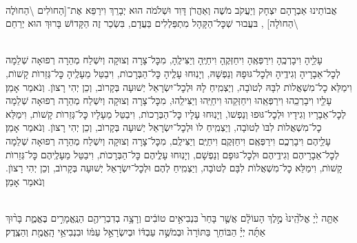 \documentclass[twoside, openany, parskip=half, 11pt]{book}
\begin{document}
\begin{sometimes}
\\
אֲבוֹתֵינוּ אַבְרָהָם יִצְחָק וְיַעֲקֹב מֹשֶׁה וְאַהֲרֹן דָּוִד וּשְׁלֹמֹה הוּא יְבָרֵךְ וִירַפֵּא אֶת־[הַחוׂלִים \textbackslash הַחוׂלֶה \textbackslash הַחוׂלָה]
,
בּעֲבוּר שְׁכׇּל־הַקָּהָל מִתְפַּלְלִים בַּעֲדָם, בִּשְׂכַר זֶה
הַקָּדוֹשׁ בָּרוּךְ הוּא יְרַחֵם
\setcolumnwidth{1.4in,1.4in,1.4in}
\begin{paracol}{3}
\\
עָלֵָיהָ וִיבָרְכֶֽהָ וִירַפְּאֶֽהָ וִיחַזְּקֶֽהָ וִיחַיֶּֽהָ וְיַצִּילֶֽהָ, מִכׇּל־צָרָה וְצוּקָה וְיִשְׁלַח מְהֵרָה רְפוּאָה שְׁלֵמָה לְכׇל־אֵבָרָיהָ וְגִידֶֽיהָ וּלְכׇל־גּוּפָהּ וְנַפְשָׁהּ, וְיָנֽוּחוּ עָלְֶיהָ כׇּל־הַבְּרָכוׂת, וִיבַטֵּל מֵעָלֶֽיהָ כׇּל־גְּזֵרוׂת קָשׁוׂת, וִימַלֵּא כׇל־מִשְׁאֲלוׂת לִבָּהּ לְטוׂבָה, וְיַצְמִֽיחַ לָהּ וּלְכׇל־יִשְׂרָאֵל יְשׁוּעָה בְּקָרוׂב, וְכֵן יְהִי רָצוׂן. וְנֹאמַר אָמֵן׃
\switchcolumn
{}\\
עָלֵָיו וִיבָרְכֵֽהוּ וִירַפְּאֵֽהוּ וִיחַזְּקֵהוּ וִיחַיֵּֽהוּ וְיַצִּילֵֽהוּ, מִכׇּל־צָרָה וְצוּקָה וְיִשְׁלַח מְהֵרָה רְפוּאָה שְׁלֵמָה לְכׇל־אֵבָרָיו וְגִידָיו וּלְכׇל־גּוּפוּ וְנַפְשׁוׂ, וְיָנֽוּחוּ עָלָיו כׇּל־הַבְּרָכוׂת, וִיבַטֵּל מֵעָלָיו כׇּל־גְּזֵרוׂת קָשׁוׂת, וִימַלֵּא כׇל־מִשְׁאֲלוׂת לִבּוׂ לְטוׂבָה, וְיַצְמִֽיחַ לוׂ וּלְכׇל־יִשְׂרָאֵל יְשׁוּעָה בְּקָרוׂב, וְכֵן יְהִי רָצוׂן. וְנֹאמַר אָמֵן׃
\switchcolumn
{}\\
עָלֵָיהֶם וִיבָרְכְֶם וִירַפְּאֶֽם וִיחַזְּקֶֽם וִיחַיֶּֽם וְיַצִּילֶֽם, מִכׇּל־צָרָה וְצוּקָה וְיִשְׁלַח מְהֵרָה רְפוּאָה שְׁלֵמָה לְכׇל־אֵבָרָיהֶם וְגִידֶֽיהֶם וּלְכׇל־גּוּפָם וְנַפְשָׁם, וְיָנֽוּחוּ עָלְֶיהֶם כׇּל־הַבְּרָכוׂת, וִיבַטֵּל מֵעָלֶֽיהֶם כׇּל־גְּזֵרוׂת קָשׁוׂת, וִימַלֵּא כׇל־מִשְׁאֲלוׂת לִבָּם לְטוׂבָה, וְיַצְמִֽיחַ לְהֶם וּלְכׇל־יִשְׂרָאֵל יְשׁוּעָה בְּקָרוׂב, וְכֵן יְהִי רָצוׂן. וְנֹאמַר אָמֵן׃
\end{paracol}

\end{sometimes}

\halfkaddish

\hagbaha
\newpage
{}

\\
אַתָּ֤ה יְ֙יָ אֱלֹ֙הֵֽינוּ֙ מֶ֣לֶךְ הָעוֹלָ֔ם אֲשֶׁ֤ר בָּחַר֙ בִּנְבִיאִ֣ים טוֹבִ֔ים וְרָצָ֥ה בְדִבְרֵיהֶ֖ם הַנֶּֽאֱמָרִ֣ים בֶּאֱמֶ֑ת בָּר֨וּךְ אַתָּ֜ה יְיָ֗ הַבּוֹחֵר֚ בַּתּוֹרָה֙ וּבְמֹשֶׁ֣ה עַבְדּ֔וֹ וּבְיִשְׂרָאֵ֣ל עַמּ֔וֹ וּבִנְבִיאֵ֥י הָֽאֱמֶ֖ת וְהַצֶֽדֶק׃
\end{document}
